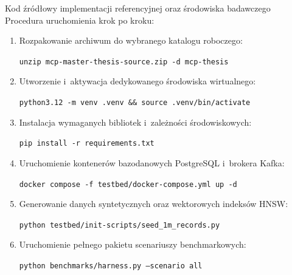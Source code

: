 \begin{easyappendix}{Kod źródłowy implementacji referencyjnej oraz środowiska badawczego}
Procedura uruchomienia krok po kroku:
\begin{enumerate}
    \item Rozpakowanie archiwum do wybranego katalogu roboczego:
    \begin{center}
        \texttt{unzip mcp-master-thesis-source.zip -d mcp-thesis}
    \end{center}
    \item Utworzenie i~aktywacja dedykowanego środowiska wirtualnego:
    \begin{center}
        \texttt{python3.12 -m venv .venv \&\& source .venv/bin/activate}
    \end{center}
    \item Instalacja wymaganych bibliotek i~zależności środowiskowych:
    \begin{center}
        \texttt{pip install -r requirements.txt}
    \end{center}
    \item Uruchomienie kontenerów bazodanowych PostgreSQL i~brokera Kafka:
    \begin{center}
        \texttt{docker compose -f testbed/docker-compose.yml up -d}
    \end{center}
    \item Generowanie danych syntetycznych oraz wektorowych indeksów HNSW:
    \begin{center}
        \texttt{python testbed/init-scripts/seed\_1m\_records.py}
    \end{center}
    \item Uruchomienie pełnego pakietu scenariuszy benchmarkowych:
    \begin{center}
        \texttt{python benchmarks/harness.py --scenario all}
    \end{center}
\end{enumerate}

\end{easyappendix}
